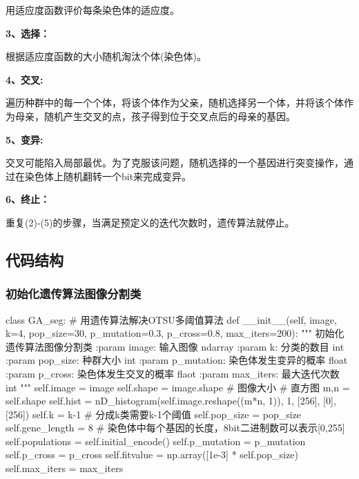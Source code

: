 \documentclass{article}
\begin{document}
用适应度函数评价每条染色体的适应度。

\textbf{3、选择：}

根据适应度函数的大小随机淘汰个体(染色体)。

\textbf{4、交叉:}

遍历种群中的每一个个体，将该个体作为父亲，随机选择另一个体，并将该个体作为母亲，随机产生交叉的点，孩子得到位于交叉点后的母亲的基因。

\textbf{5、变异:}

交叉可能陷入局部最优。为了克服该问题，随机选择的一个基因进行突变操作，通过在染色体上随机翻转一个bit来完成变异。

\textbf{6、终止：}

重复(2)-(5)的步骤，当满足预定义的迭代次数时，遗传算法就停止。


\subsection{代码结构}

\subsubsection{初始化遗传算法图像分割类}

\begin{python}
	class GA_seg:
    # 用遗传算法解决OTSU多阈值算法
    def __init__(self, image, k=4, pop_size=30, p_mutation=0.3, p_cross=0.8, max_iters=200):
        """
        初始化遗传算法图像分割类
        :param image: 输入图像 ndarray
        :param k: 分类的数目 int
        :param pop_size: 种群大小 int
        :param p_mutation: 染色体发生变异的概率 float
        :param p_cross: 染色体发生交叉的概率 flaot
        :param max_iters: 最大迭代次数 int
        """
        self.image = image
        self.shape = image.shape  # 图像大小
        # 直方图
        m,n = self.shape
        self.hist = nD_histogram(self.image.reshape((m*n, 1)), 1, [256], [0], [256])
        self.k = k-1  # 分成k类需要k-1个阈值
        self.pop_size = pop_size
        self.gene_length = 8  # 染色体中每个基因的长度，8bit二进制数可以表示[0,255]
        self.populations = self.initial_encode()
        self.p_mutation = p_mutation
        self.p_cross = p_cross
        self.fitvalue = np.array([1e-3] * self.pop_size)
        self.max_iters = max_iters
\end{python}
\end{document}
